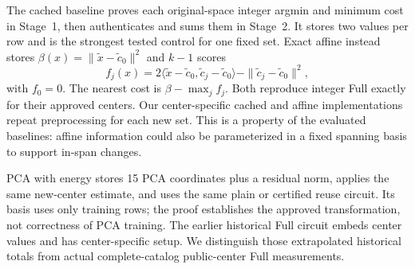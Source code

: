 The cached baseline proves each original-space integer argmin and minimum cost in Stage~1, then authenticates and sums them in Stage~2. It stores two values per row and is the strongest tested control for one fixed set. Exact affine instead stores $\beta(x)=\|\widetilde x-\widetilde c_0\|^2$ and $k-1$ scores
\begin{equation}
f_j(x)=2\langle\widetilde x-\widetilde c_0,\widetilde c_j-\widetilde c_0\rangle-
\|\widetilde c_j-\widetilde c_0\|^2,
\end{equation}
with $f_0=0$. The nearest cost is $\beta-\max_j f_j$. Both reproduce integer Full exactly for their approved centers. Our center-specific cached and affine implementations repeat preprocessing for each new set. This is a property of the evaluated baselines: affine information could also be parameterized in a fixed spanning basis to support in-span changes.

PCA with energy stores 15 PCA coordinates plus a residual norm, applies the same new-center estimate, and uses the same plain or certified reuse circuit. Its basis uses only training rows; the proof establishes the approved transformation, not correctness of PCA training. The earlier historical Full circuit embeds center values and has center-specific setup. We distinguish those extrapolated historical totals from actual complete-catalog public-center Full measurements.

